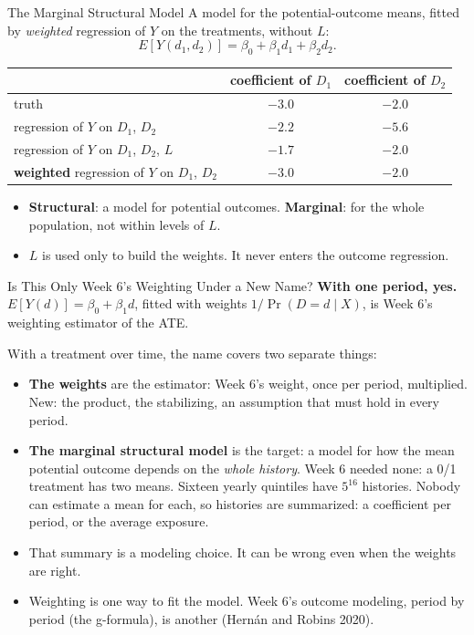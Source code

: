 \documentclass[aspectratio=169,11pt,xcolor=dvipsnames]{beamer}
\newcommand{\srcp}[1]{{\scriptsize\color{gray}(#1)}}
\begin{document}
\begin{frame}{The Marginal Structural Model}
A model for the potential-outcome means, fitted by \emph{weighted} regression of $Y$ on the
treatments, without $L$:
\[ E[Y(d_1, d_2)] = \beta_0 + \beta_1 d_1 + \beta_2 d_2 . \]
\vskip-8pt
\begin{center}\small
\renewcommand{\arraystretch}{1.1}
\begin{tabular}{@{}lcc@{}}
\toprule
 & coefficient of $D_1$ & coefficient of $D_2$ \\
\midrule
truth & $-3.0$ & $-2.0$ \\
regression of $Y$ on $D_1$, $D_2$ & $-2.2$ & $-5.6$ \\
regression of $Y$ on $D_1$, $D_2$, $L$ & $-1.7$ & $-2.0$ \\
\textbf{weighted} regression of $Y$ on $D_1$, $D_2$ & $-3.0$ & $-2.0$ \\
\bottomrule
\end{tabular}
\end{center}
\begin{itemize}\itemsep3pt
  \item \textbf{Structural}: a model for potential outcomes. \textbf{Marginal}: for the whole
        population, not within levels of $L$.
  \item $L$ is used only to build the weights. It never enters the outcome regression.
\end{itemize}
\end{frame}

\begin{frame}{Is This Only Week 6's Weighting Under a New Name?}
\textbf{With one period, yes.} $E[Y(d)] = \beta_0 + \beta_1 d$, fitted with weights
$1 / \Pr(D = d \mid X)$, is Week 6's weighting estimator of the ATE.
\par\vskip3pt
With a treatment over time, the name covers two separate things:
\begin{itemize}\itemsep4pt
  \item \textbf{The weights} are the estimator: Week 6's weight, once per period, multiplied.
        New: the product, the stabilizing, an assumption that must hold in every period.
  \item \textbf{The marginal structural model} is the target: a model for how the mean potential
        outcome depends on the \emph{whole history}. Week 6 needed none: a 0/1 treatment has two
        means. Sixteen yearly quintiles have $5^{16}$ histories. Nobody can estimate a mean for
        each, so histories are summarized: a coefficient per period, or the average exposure.
\end{itemize}
\begin{itemize}\itemsep3pt
  \item That summary is a modeling choice. It can be wrong even when the weights are right.
  \item Weighting is one way to fit the model. Week 6's outcome modeling, period by
        period (the g-formula), is another \srcp{Hern\'an and Robins 2020}.
\end{itemize}
\end{frame}
\end{document}
